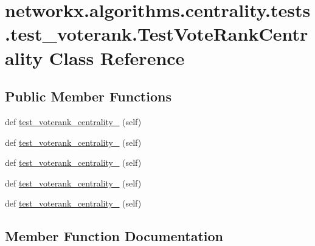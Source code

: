 \hypertarget{classnetworkx_1_1algorithms_1_1centrality_1_1tests_1_1test__voterank_1_1TestVoteRankCentrality}{}\section{networkx.\+algorithms.\+centrality.\+tests.\+test\+\_\+voterank.\+Test\+Vote\+Rank\+Centrality Class Reference}
\label{classnetworkx_1_1algorithms_1_1centrality_1_1tests_1_1test__voterank_1_1TestVoteRankCentrality}
\subsection*{Public Member Functions}
\begin{DoxyCompactItemize}
\item 
def \hyperlink{classnetworkx_1_1algorithms_1_1centrality_1_1tests_1_1test__voterank_1_1TestVoteRankCentrality_a639d973efa3a14ead5355923dabb510c}{test\+\_\+voterank\+\_\+centrality\+\_} (self)
\item 
def \hyperlink{classnetworkx_1_1algorithms_1_1centrality_1_1tests_1_1test__voterank_1_1TestVoteRankCentrality_a41505b2924b8dd48a173dcd8281f5e32}{test\+\_\+voterank\+\_\+centrality\+\_} (self)
\item 
def \hyperlink{classnetworkx_1_1algorithms_1_1centrality_1_1tests_1_1test__voterank_1_1TestVoteRankCentrality_af3e9ccc61bf2e87ae73541ff7d0876fd}{test\+\_\+voterank\+\_\+centrality\+\_} (self)
\item 
def \hyperlink{classnetworkx_1_1algorithms_1_1centrality_1_1tests_1_1test__voterank_1_1TestVoteRankCentrality_aa712a72c54b78e805d0940edcf0410e4}{test\+\_\+voterank\+\_\+centrality\+\_} (self)
\item 
def \hyperlink{classnetworkx_1_1algorithms_1_1centrality_1_1tests_1_1test__voterank_1_1TestVoteRankCentrality_a3a9381b81752d836c9765d6d94727baa}{test\+\_\+voterank\+\_\+centrality\+\_} (self)
\end{DoxyCompactItemize}


\subsection{Member Function Documentation}
\mbox{\label{classnetworkx_1_1algorithms_1_1centrality_1_1tests_1_1test__voterank_1_1TestVoteRankCentrality_a639d973efa3a14ead5355923dabb510c}} 
